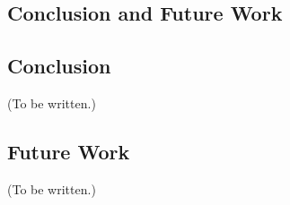 \begin{EnChapter}

\chapter{Conclusion and Future Work}
\label{chap:conclusion}


\section{Conclusion}

(To be written.)

\section{Future Work}

(To be written.)

\end{EnChapter}
